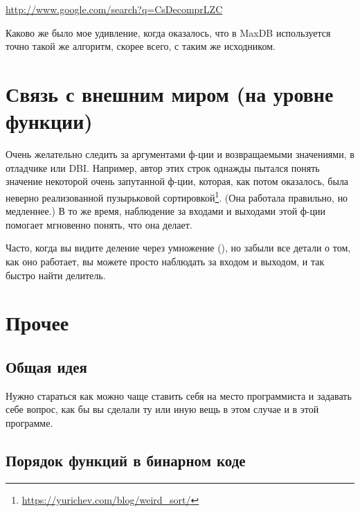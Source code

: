 \url{http://www.google.com/search?q=CsDecomprLZC}

Каково же было мое удивление, когда оказалось, что в MaxDB используется точно такой же алгоритм, 
скорее всего, с таким же исходником.



\section{Связь с внешним миром (на уровне функции)}
Очень желательно следить за аргументами ф-ции и возвращаемыми значениями, в отладчике или \ac{DBI}.
Например, автор этих строк однажды пытался понять значение некоторой очень запутанной ф-ции, которая, как потом оказалось,
была неверно реализованной пузырьковой сортировкой\footnote{\url{https://yurichev.com/blog/weird_sort/}}.
(Она работала правильно, но медленнее.)
В то же время, наблюдение за входами и выходами этой ф-ции помогает мгновенно понять, что она делает.

Часто, когда вы видите деление через умножение (),
но забыли все детали о том, как оно работает, вы можете просто наблюдать за входом и выходом, и так быстро найти делитель.













\section{Прочее}

\subsection{Общая идея}

Нужно стараться как можно чаще ставить себя на место программиста и задавать себе вопрос, 
как бы вы сделали ту или иную вещь в этом случае и в этой программе.

\subsection{Порядок функций в бинарном коде}

